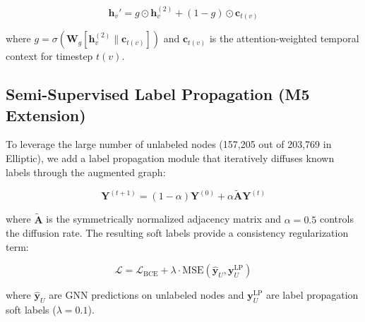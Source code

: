 \begin{equation}
    \mathbf{h}_v' = g \odot \mathbf{h}_v^{(2)} + (1 - g) \odot \mathbf{c}_{t(v)}
\end{equation}

where $g = \sigma(\mathbf{W}_g [\mathbf{h}_v^{(2)} \| \mathbf{c}_{t(v)}])$ and $\mathbf{c}_{t(v)}$ is the attention-weighted temporal context for timestep $t(v)$.

\subsection{Semi-Supervised Label Propagation (M5 Extension)}

To leverage the large number of unlabeled nodes (157,205 out of 203,769 in Elliptic), we add a label propagation module that iteratively diffuses known labels through the augmented graph:

\begin{equation}
    \mathbf{Y}^{(t+1)} = (1 - \alpha) \mathbf{Y}^{(0)} + \alpha \tilde{\mathbf{A}} \mathbf{Y}^{(t)}
\end{equation}

where $\tilde{\mathbf{A}}$ is the symmetrically normalized adjacency matrix and $\alpha = 0.5$ controls the diffusion rate. The resulting soft labels provide a consistency regularization term:

\begin{equation}
    \mathcal{L} = \mathcal{L}_{\text{BCE}} + \lambda \cdot \text{MSE}(\hat{\mathbf{y}}_U, \mathbf{y}_U^{\text{LP}})
\end{equation}

where $\hat{\mathbf{y}}_U$ are GNN predictions on unlabeled nodes and $\mathbf{y}_U^{\text{LP}}$ are label propagation soft labels ($\lambda = 0.1$).
